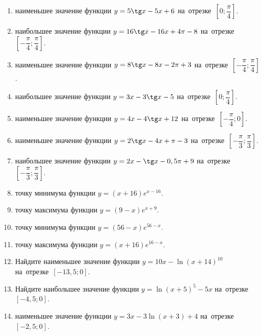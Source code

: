 \documentclass[a4paper,10pt]{article}
\begin{document}
\begin{enumerate}
\item {} наименьшее значение функции $y=5\tg x-5x+6$ на~отрезке~$\left[0;\dfrac{\pi }{4}\right]$.

\item {} наибольшее значение функции $y=16\tg x-16x+4\pi -8$ на~отрезке~$\left[-\dfrac{\pi }{4};\dfrac{\pi }{4}\right]$.

\item {} наименьшее значение функции $y=8\tg x-8x-2\pi +3$ на~отрезке~$\left[-\dfrac{\pi }{4};\dfrac{\pi }{4}\right]$.

\item {} наибольшее значение функции $y=3x-3\tg x-5$ на~отрезке~$\left[0;\dfrac{\pi }{4}\right]$.

\item {} наименьшее значение функции $y=4x-4\tg x+12$ на~отрезке~$\left[-\dfrac{\pi }{4};0\right]$.

\item {} наименьшее значение функции $y=2\tg x-4x+\pi -3$ на~отрезке~$\left[-\dfrac{\pi }{3};\dfrac{\pi }{3}\right]$.

\item {} наибольшее значение функции $y=2x-\tg x-0,5\pi +9$ на~отрезке~$\left[-\dfrac{\pi }{3};\dfrac{\pi }{3}\right]$.

\item {} точку минимума функции $y=\left(x+16\right)e^{x-16}$.

\item {} точку максимума функции $y=\left(9-x\right)e^{x+9}$.

\item {} точку минимума функции $y = \left(56-x\right)e^{56-x}$.

\item {} точку максимума функции $y=\left(x+16\right)e^{16-x}$.

\item Найдите наименьшее значение функции $y = 10x-\ln \left(x+14\right)^{10}$ на~отрезке~$\left[-13,5;0\right]$.

\item Найдите наибольшее значение функции $y=\ln \left(x+5\right)^5-5x$ на~отрезке~$\left[-4,5;0\right]$.

\item {} наименьшее значение функции $y=3x-3\ln \left(x+3\right)+4$ на~отрезке~$\left[-2,5;0\right]$.


\end{enumerate}
\end{document}
